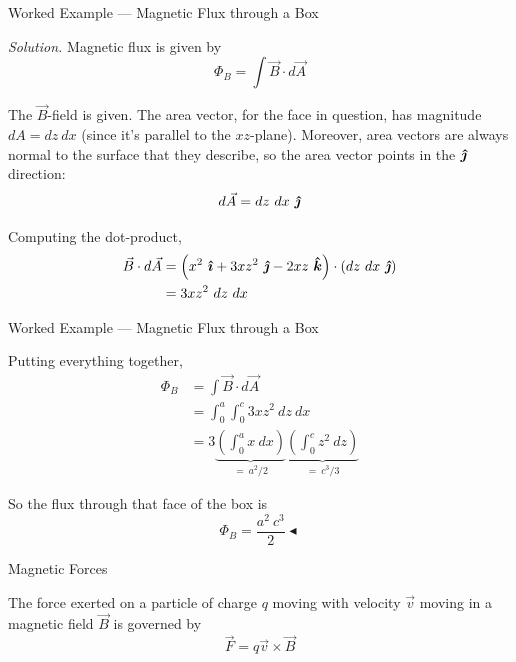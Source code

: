 \documentclass{beamer}
\begin{document}
\begin{frame}{Worked Example --- Magnetic Flux through a Box}

\textit{Solution.} Magnetic flux is given by
\begin{equation*}
    \Phi_B = \int \vec{B} \cdot d\vec{A}
\end{equation*}

The $\vec{B}$-field is given. The area vector, for the face in question, has magnitude $dA = dz\ dx$ (since it's parallel to the $xz$-plane). Moreover, area vectors are always normal to the surface that they describe, so the area vector points in the $\bm{\hat{\jmath}}$ direction:
\begin{equation*}
    d\vec{A} = dz\ dx\ \bm{\hat{\jmath}}
\end{equation*}

Computing the dot-product,
\begin{align*}
    \vec{B} \cdot d\vec{A} &= \left( x^2\ \bm{\hat{\imath}} + 3xz^2\ \bm{\hat{\jmath}} - 2xz\ \bm{\hat{k}} \right) \cdot \left( dz\ dx\ \bm{\hat{\jmath}} \right) \\
                           &= 3xz^2\ dz\ dx
\end{align*}

\end{frame}

\begin{frame}{Worked Example --- Magnetic Flux through a Box}

Putting everything together,
\begin{align*}
    \Phi_B &= \int \vec{B} \cdot d\vec{A} \\
           &= \int_{0}^{a} \int_{0}^{c} 3xz^2\ dz\ dx \\
           &= 3 \underbrace{\left( \int_{0}^{a} x\ dx \right)}_{=\ a^2/2} \underbrace{\left( \int_{0}^{c} z^2\ dz \right)}_{=\ c^3/3}
\end{align*}

So the flux through that face of the box is
\begin{equation*}
    \boxed{\Phi_B = \frac{a^2\ c^3}{2}} \blacktriangleleft
\end{equation*}

\end{frame}

\begin{frame}{Magnetic Forces}

The force exerted on a particle of charge $q$ moving with velocity $\vec{v}$ moving in a magnetic field $\vec{B}$ is governed by
\begin{equation*}
    \vec{F} = q\vec{v} \times \vec{B}
\end{equation*}

\end{frame}
\end{document}

